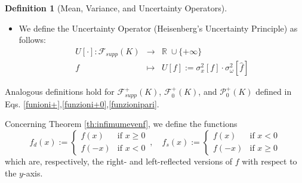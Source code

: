 \documentclass[preprint,hidelinks,authoryear]{elsarticle}
\theoremstyle{plain}
\theoremstyle{definition}
\newtheorem{definition}[theorem]{Definition}
\theoremstyle{remark}
\begin{document}
{\begin{definition}[Mean, Variance, and Uncertainty Operators]
\begin{itemize}
\begin{equation}
\begin{array}{rcl}
    \hat{f} & \mapsto & \sigma_{\omega}^2[\hat{f}]:=\displaystyle\frac{1}{2\pi \left \| f\right \|^2}\displaystyle\int_{\mathbb R} (\omega-\beta[\hat{f}])^2|\hat{f}(\omega)|^2 \; d\omega
\end{array}
\end{equation}
\item[c)] We define the Uncertainty Operator (Heisenberg's Uncertainty Principle) as follows:
\begin{equation}
    \begin{array}{rcl}
    U[\cdot]: \mathcal{F}_{supp}(K) & \to & \mathbb{R} \; \cup \{+\infty\} \\
    f & \mapsto & U[f]:= \sigma_x^2[f] \cdot \sigma_{\omega}^2[\hat{f}]
    \label{incertezza}
    \end{array}
\end{equation}
\end{itemize}
Analogous definitions hold for $\mathcal{F}^+_{supp}(K)$, $\mathcal{F}^+_{0}(K)$, and $\mathcal{P}^+_{0}(K)$ defined in Eqs. \eqref{funioni+},\eqref{funzioni+0},\eqref{funzionipari}.
\end{definition}
Concerning Theorem \ref{th:infimumevenf}, we define the functions  
\begin{equation}
\label{eq:simmetryfunctions}
f_d(x) :=  
\begin{cases}  
f(x) & \text{if } x \geq 0 \\  
f(-x) & \text{if } x < 0  
\end{cases}  \, , \quad 
f_s(x) :=  
\begin{cases}  
f(x) & \text{if } x < 0 \\  
f(-x) & \text{if } x \geq 0  
\end{cases}    
\end{equation}  
which are, respectively, the right- and left-reflected versions of $ f $ with respect to the $ y $-axis.}
\end{document}
